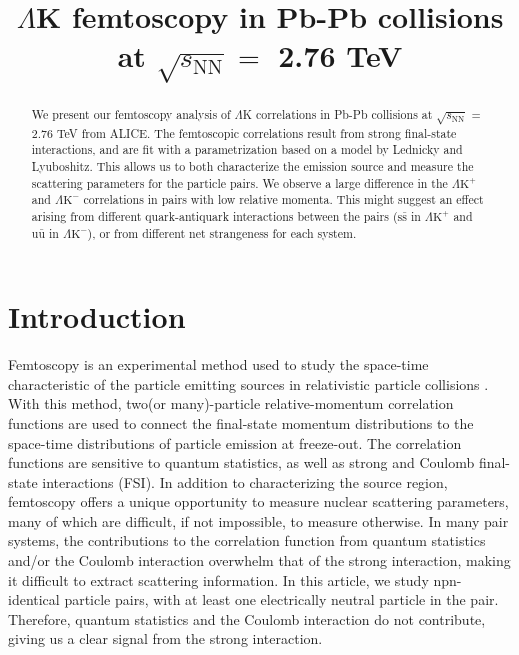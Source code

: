 \documentclass[ALICE,manyauthors]{cernphprep}
\newcommand{\LamK}{$\Lambda$K\xspace}
\newcommand{\LamKchP}{$\Lambda\mathrm{K^{+}}$\xspace}
\newcommand{\LamKchM}{$\Lambda\mathrm{K^{-}}$\xspace}
\begin{document}
%

\begin{titlepage}
%
%

\title{\LamK femtoscopy in Pb-Pb collisions at $\sqrt{s_{\mathrm{NN}}} = $ 2.76 TeV}
\ShortTitle{\LamK femtoscopy in Pb-Pb collisions}   %


\begin{abstract}
We present our femtoscopy analysis of \LamK correlations in Pb-Pb collisions at $\sqrt{s_{\mathrm{NN}}}$ = 2.76 TeV from ALICE.  
The femtoscopic correlations result from strong final-state interactions, and are fit with a parametrization based on a model by Lednicky and Lyuboshitz.  
This allows us to both characterize the emission source and measure the scattering parameters for the particle pairs.  
We observe a large difference in the \LamKchP and \LamKchM correlations in pairs with low relative momenta.  
This might suggest an effect arising from different quark-antiquark interactions between the pairs ($\mathrm{s}\bar{\mathrm{s}}$ in \LamKchP and $\mathrm{u}\bar{\mathrm{u}}$ in \LamKchM), or from different net strangeness for each system.
\end{abstract}
\end{titlepage}
\setcounter{page}{2}

\section{Introduction}
\label{sec:Introduction}

Femtoscopy is an experimental method used to study the space-time characteristic of the particle emitting sources in relativistic particle collisions \cite{Lisa:2005dd}.  With this method, two(or many)-particle relative-momentum correlation functions are used to connect the final-state momentum distributions to the space-time distributions of particle emission at freeze-out.  The correlation functions are sensitive to quantum statistics, as well as strong and Coulomb final-state interactions (FSI).  In addition to characterizing the source region, femtoscopy offers a unique opportunity to measure nuclear scattering parameters, many of which are difficult, if not impossible, to measure otherwise.  In many pair systems, the contributions to the correlation function from quantum statistics and/or the Coulomb interaction overwhelm that of the strong interaction, making it difficult to extract scattering information.  In this article, we study npn-identical particle pairs, with at least one electrically neutral particle in the pair.  Therefore, quantum statistics and the Coulomb interaction do not contribute, giving us a clear signal from the strong interaction.
\end{document}
